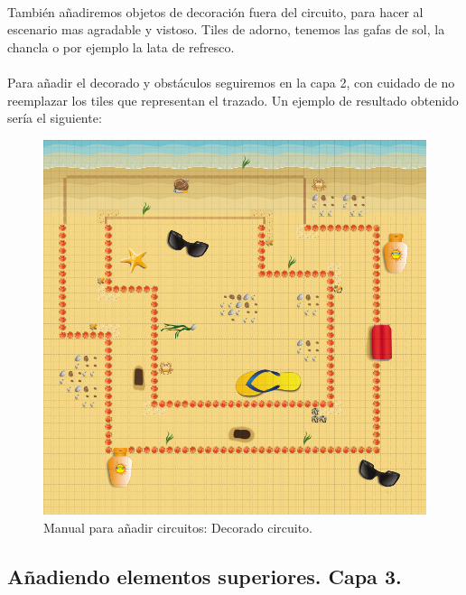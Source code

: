 \paragraph{}
También añadiremos objetos de decoración fuera del circuito, para hacer al escenario mas agradable y vistoso. Tiles de adorno,
tenemos las gafas de sol, la chancla o por ejemplo la lata de refresco.

\paragraph{}
Para añadir el decorado y obstáculos seguiremos en la capa 2, con cuidado de no reemplazar los tiles que representan el trazado.
Un ejemplo de resultado obtenido sería el siguiente:

\begin{figure}[H]
  \label{circuito_decorado}
  \begin{center}
    \includegraphics[scale=0.5]{imagenes/manualcircuito/circuito_decorado.png}
  \end{center}
  \caption{Manual para añadir circuitos: Decorado circuito.}
\end{figure}

\subsection{Añadiendo elementos superiores. Capa 3.}

